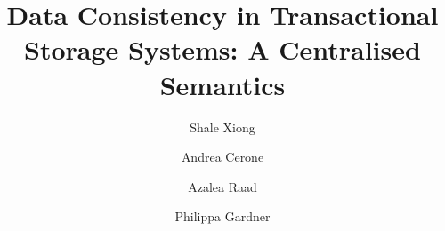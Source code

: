 \documentclass[a4paper,UKenglish,cleveref,autoref,thm-restate,authorcolumns]{lipics-v2019}
\title{%
Data Consistency in Transactional Storage Systems: 
A Centralised Semantics%
}
\author{Shale Xiong}{Department of Computing, Imperial College London, UK}{sx14@ic.ac.uk}{[orcid]}{[funding]}
\author{Andrea Cerone}{Football Radar, UK}{andrea.cerone@footballradar.com}{[orcid]}{[funding]}
\author{Azalea Raad}{MPI-SWS, Germany}{azalea@mpi-sws.org}{[orcid]}{[funding]}
\author{Philippa Gardner}{Department of Computing, Imperial College London, UK}{p.gardner@ic.ac.uk}{[orcid]}{[funding]}
\newcommand{\RootPath}{.}
\begin{document}
\maketitle

\begin{abstract}

\end{abstract}






%






\newpage
\onecolumn
\appendix

%

\end{document}

